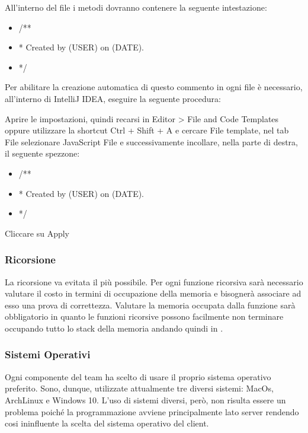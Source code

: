 All'interno del file i metodi dovranno contenere la seguente intestazione:
\begin{itemize}
\color{ForestGreen}
\item /**
\item * Created by (USER) on (DATE).

\item */
\end{itemize}


Per abilitare la creazione automatica di questo commento in ogni file è necessario, all'interno di IntelliJ IDEA, eseguire la seguente procedura:

Aprire le impostazioni, quindi recarsi in Editor > File and Code Templates oppure utilizzare la shortcut Ctrl + Shift + A e cercare File template,
nel tab File selezionare JavaScript File e successivamente incollare, nella parte di destra, il seguente spezzone:
\begin{itemize}
\color{ForestGreen}
\item/**
\item * Created by (USER) on (DATE).

\item */
\end{itemize}

Cliccare su Apply

  
\subsubsection{Ricorsione}
La ricorsione va evitata il più possibile. Per ogni funzione ricorsiva sarà necessario valutare il costo in termini di occupazione della memoria e bisognerà associare ad esso una prova di correttezza.
Valutare la memoria occupata dalla funzione sarà obbligatorio in quanto le funzioni ricorsive possono facilmente non terminare occupando tutto lo stack della memoria andando quindi in .

\subsubsection{Sistemi Operativi}
Ogni componente del team ha scelto di usare il proprio sistema operativo preferito. Sono, dunque, utilizzate attualmente tre diversi sistemi: MacOs,  ArchLinux e Windows 10. L'uso di sistemi diversi, però, non risulta essere un problema poiché la programmazione avviene principalmente lato server rendendo cosi ininfluente la scelta del sistema operativo del client.

